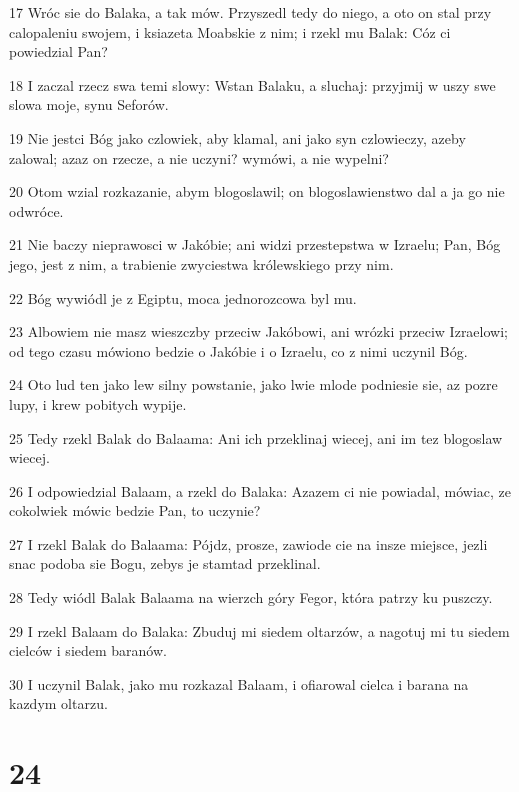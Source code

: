 \par 17 Wróc sie do Balaka, a tak mów. Przyszedl tedy do niego, a oto on stal przy calopaleniu swojem, i ksiazeta Moabskie z nim; i rzekl mu Balak: Cóz ci powiedzial Pan?
\par 18 I zaczal rzecz swa temi slowy: Wstan Balaku, a sluchaj: przyjmij w uszy swe slowa moje, synu Seforów.
\par 19 Nie jestci Bóg jako czlowiek, aby klamal, ani jako syn czlowieczy, azeby zalowal; azaz on rzecze, a nie uczyni? wymówi, a nie wypelni?
\par 20 Otom wzial rozkazanie, abym blogoslawil; on blogoslawienstwo dal a ja go nie odwróce.
\par 21 Nie baczy nieprawosci w Jakóbie; ani widzi przestepstwa w Izraelu; Pan, Bóg jego, jest z nim, a trabienie zwyciestwa królewskiego przy nim.
\par 22 Bóg wywiódl je z Egiptu, moca jednorozcowa byl mu.
\par 23 Albowiem nie masz wieszczby przeciw Jakóbowi, ani wrózki przeciw Izraelowi; od tego czasu mówiono bedzie o Jakóbie i o Izraelu, co z nimi uczynil Bóg.
\par 24 Oto lud ten jako lew silny powstanie, jako lwie mlode podniesie sie, az pozre lupy, i krew pobitych wypije.
\par 25 Tedy rzekl Balak do Balaama: Ani ich przeklinaj wiecej, ani im tez blogoslaw wiecej.
\par 26 I odpowiedzial Balaam, a rzekl do Balaka: Azazem ci nie powiadal, mówiac, ze cokolwiek mówic bedzie Pan, to uczynie?
\par 27 I rzekl Balak do Balaama: Pójdz, prosze, zawiode cie na insze miejsce, jezli snac podoba sie Bogu, zebys je stamtad przeklinal.
\par 28 Tedy wiódl Balak Balaama na wierzch góry Fegor, która patrzy ku puszczy.
\par 29 I rzekl Balaam do Balaka: Zbuduj mi siedem oltarzów, a nagotuj mi tu siedem cielców i siedem baranów.
\par 30 I uczynil Balak, jako mu rozkazal Balaam, i ofiarowal cielca i barana na kazdym oltarzu.

\chapter{24}

